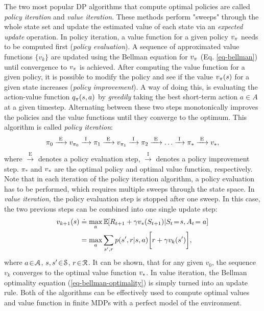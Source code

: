 \documentclass[a4paper, twoside, 12pt]{article}
\begin{document}
The two most popular DP algorithms that compute optimal policies are called
\emph{policy iteration} and \emph{value iteration}. These methods perform "sweeps" through
the whole state set and update the estimated value of each state via an
\emph{expected update} operation. In policy iteration, a value function for a given
policy \(\vpi\) needs to be computed first (\emph{policy evaluation}). A sequence of
approximated value functions \(\{v_k\}\) are updated using the Bellman equation
for \(\vpi\) (Eq. \ref{eq-bellman}) until convergence to \(\vpi\) is achieved. After
computing the value function for a given policy, it is possible to modify the
policy and see if the value \(\vpi(s)\) for a given state increases (\emph{policy
improvement}). A way of doing this, is evaluating the action-value function
\(\qpi(s,a)\) by \emph{greedily} taking the best short-term action \(a\!\in\!A\) at a
given timestep. Alternating between these two steps monotonically improves the
policies and the value functions until they converge to the optimum. This
algorithm is called \emph{policy iteration}:
\begin{equation}
    \pi_0 \xrightarrow{\text{ E }} v_{\pi_0} \xrightarrow{\text{ I }}
    \pi_1 \xrightarrow{\text{ E }} v_{\pi_1} \xrightarrow{\text{ I }}
    \pi_2 \xrightarrow{\text{ E }} \hdots \xrightarrow{\text{ I }}
    \pi_* \xrightarrow{\text{ E }} \vstar,
\end{equation}
where \(\xrightarrow{\text{ E }}\) denotes a policy evaluation step,
\(\xrightarrow{\text{ I }}\) denotes a policy improvement step. \(\pi_*\) and
\(\vstar\) are the optimal policy and optimal value function, respectively. Note
that in each iteration of the policy iteration algorithm, a policy evaluation
has to be performed, which requires multiple sweeps through the state space. In
\emph{value iteration}, the policy evaluation step is stopped after one sweep. In
this case, the two previous steps can be combined into one single update step:
\begin{equation}
\begin{split}
    v_{k+1}(s) &\defeq \max_a \EE{}{R_{t+1}+\gamma \vstar(S_{t+1})|S_t\!=\!s, A_t\!=a} \\
    &= \max_{a}\sum_{s',r}{p(s',r|s,a)}\bigg[r+\gamma v_k(s')\bigg],
\end{split}
\end{equation}
where \(a\!\in\!\A\), \(s,s'\!\in\!\S\), \(r\!\in\!\R\). It can be shown, that for any
given \(v_0\), the sequence \({v_k}\) converges to the optimal value function
\({\vstar}\). In value iteration, the Bellman optimality equation
(\ref{eq-bellman-optimality}) is simply turned into an update rule. Both of the
algorithms can be effectively used to compute optimal values and value function
in finite MDPs with a perfect model of the environment.
\end{document}
